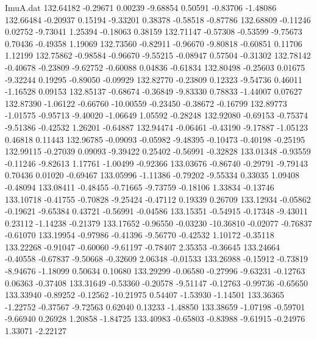 \begin{filecontents}{ImuA.dat}
 132.64182   -0.29671    0.00239   -9.68854    0.50591   -0.83706   -1.48086
 132.66484   -0.20937    0.15194   -9.33201    0.38378   -0.58518   -0.87786
 132.68809   -0.11246    0.02752   -9.73041    1.25394   -0.18063    0.38159
 132.71147   -0.57308   -0.53599   -9.75673    0.70436   -0.49358    1.19069
 132.73560   -0.82911   -0.96670   -9.80818   -0.60851    0.11706    1.12199
 132.75862   -0.98584   -0.96670   -9.55215   -0.08947    0.57504   -0.31302
 132.78142   -0.40678   -0.23809   -9.62752   -0.60088    0.04836   -0.61834
 132.80498   -0.25603    0.01675   -9.32244    0.19295   -0.89050   -0.09929
 132.82770   -0.23809    0.12323   -9.54736    0.46011   -1.16528    0.09153
 132.85137   -0.68674   -0.36849   -9.83330    0.78833   -1.44007    0.07627
 132.87390   -1.06122   -0.66760  -10.00559   -0.23450   -0.38672   -0.16799
 132.89773   -1.01575   -0.95713   -9.40020   -1.06649    1.05592   -0.28248
 132.92080   -0.69153   -0.75374   -9.51386   -0.42532    1.26201   -0.64887
 132.94474   -0.06461   -0.43190   -9.17887   -1.05123    0.46818    0.11443
 132.96785   -0.09093   -0.05982   -9.48395   -0.10473   -0.40198   -0.25195
 132.99115   -0.27039    0.09093   -9.39422    0.25402   -0.56991   -0.32828
 133.01348   -0.93559   -0.11246   -9.82613    1.17761   -1.00499   -0.92366
 133.03676   -0.86740   -0.29791   -9.79143    0.70436    0.01020   -0.69467
 133.05996   -1.11386   -0.79202   -9.55334    0.33035    1.09408   -0.48094
 133.08411   -0.48455   -0.71665   -9.73759   -0.18106    1.33834   -0.13746
 133.10718   -0.41755   -0.70828   -9.25424   -0.47112    0.19339    0.26709
 133.12934   -0.05862   -0.19621   -9.65384    0.43721   -0.56991   -0.04586
 133.15351   -0.54915   -0.17348   -9.43011    0.23112   -1.14238   -0.21379
 133.17652   -0.96550   -0.03230  -10.36810   -0.02077   -0.76837   -0.61070
 133.19954   -0.97986   -0.41396   -9.56770   -0.42532    1.10172   -0.35118
 133.22268   -0.91047   -0.60060   -9.61197   -0.78407    2.35353   -0.36645
 133.24664   -0.40558   -0.67837   -9.50668   -0.32609    2.06348   -0.01533
 133.26988   -0.15912   -0.73819   -8.94676   -1.18099    0.50634    0.10680
 133.29299   -0.06580   -0.27996   -9.63231   -0.12763    0.06363   -0.37408
 133.31649   -0.53360   -0.20578   -9.51147   -0.12763   -0.99736   -0.65650
 133.33940   -0.89252   -0.12562  -10.21975    0.54407   -1.53930   -1.14501
 133.36365   -1.22752   -0.37567   -9.72563    0.62040    0.13233   -1.48850
 133.38659   -1.07198   -0.59701   -9.66940    0.26928    1.20858   -1.84725
 133.40983   -0.65803   -0.83988   -9.61915   -0.24976    1.33071   -2.22127

\end{filecontents}
